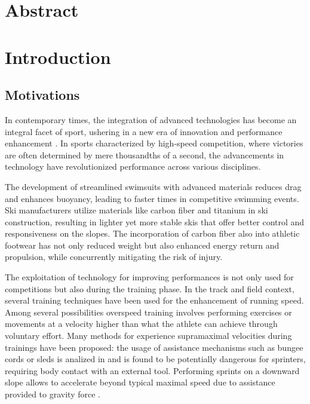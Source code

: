 \documentclass[a4paper,12pt,oneside]{book}
\begin{document}
\vfill

\newpage
\thispagestyle{empty}






\chapter*{Abstract}



\tableofcontents
\thispagestyle{empty}


\chapter*{Introduction}
	
\section*{Motivations}

In contemporary times, the integration of advanced technologies has become an integral facet of sport, ushering in a new era of innovation and performance enhancement \cite{Technology_athletics}. 
In sports characterized by high-speed competition, where victories are often determined by mere thousandths of a second, the advancements in technology have revolutionized performance across various disciplines. 
\bigskip

The development of streamlined swimsuits with advanced materials reduces drag and enhances buoyancy, leading to faster times in competitive swimming events.
Ski manufacturers utilize materials like carbon fiber and titanium in ski construction, resulting in lighter yet more stable skis that offer better control and responsiveness on the slopes.
The incorporation of carbon fiber also into athletic footwear has not only reduced weight but also enhanced energy return and propulsion, while concurrently mitigating the risk of injury.
\bigskip

The exploitation of technology for improving performances is not only used for competitions but also during the training phase. 
In the track and field context, several training techniques have been used for the enhancement of running speed. 
Among several possibilities overspeed training involves performing exercises or movements at a velocity higher than what the athlete can achieve through voluntary effort. 
Many methods for experience supramaximal velocities during trainings have been proposed: the usage of assistance mechanisms such as bungee cords or sleds is analized in \cite{Elastic_cord} and is found to be potentially dangerous for sprinters, requiring body contact with an external tool.
Performing sprints on a downward slope allows to accelerate beyond typical maximal speed due to assistance provided to gravity force \cite{Hill_slope}.
\bigskip
\end{document}
